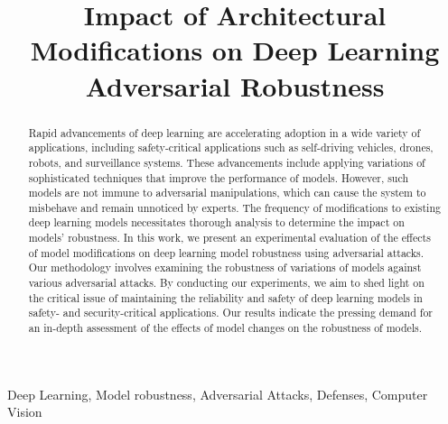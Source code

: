 
\title{Impact of Architectural Modifications on Deep Learning Adversarial Robustness}
\maketitle

\begin{abstract}
Rapid advancements of deep learning are accelerating adoption in a wide variety of applications, including safety-critical applications such as self-driving vehicles, drones, robots, and surveillance systems.
These advancements include applying variations of sophisticated techniques that improve the performance of models.
However, such models are not immune to adversarial manipulations, which can cause the system to misbehave and remain unnoticed by experts.
The frequency of modifications to existing deep learning models necessitates thorough analysis to determine the impact on models' robustness. 
In this work, we present an experimental evaluation of the effects of model modifications on deep learning model robustness using adversarial attacks.
Our methodology involves examining the robustness of variations of models against various adversarial attacks.
By conducting our experiments, we aim to shed light on the critical issue of maintaining the reliability and safety of deep learning models in safety- and security-critical applications.
Our results indicate the pressing demand for an in-depth assessment of the effects of model changes on the robustness of models.
\end{abstract}

\begin{IEEEkeywords}
Deep Learning, Model robustness, Adversarial Attacks, Defenses, Computer Vision
\end{IEEEkeywords}

\thispagestyle{plain}
